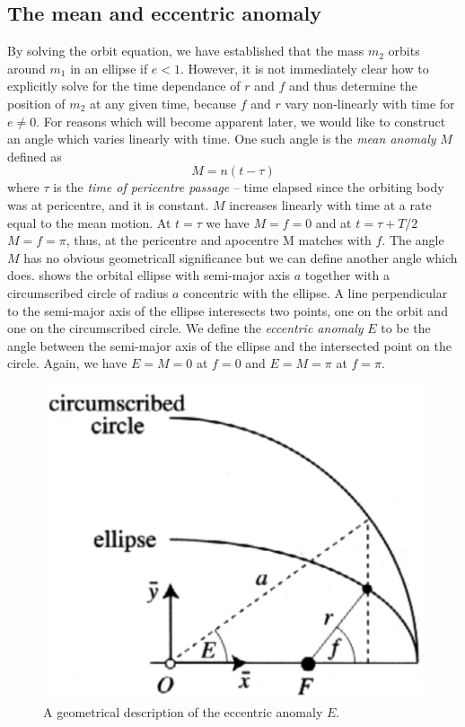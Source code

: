 \documentclass[ twoside,openright,titlepage,numbers=noenddot,headinclude,%
                footinclude=true,cleardoublepage=empty,abstractoff, %
                BCOR=5mm,paper=a4,fontsize=11pt,%
                american,%
                ]{scrreprt}
\begin{document}
\subsection{The mean and eccentric anomaly}
By solving the orbit equation, we have established that the mass $m_2$ orbits 
around $m_1$ in an ellipse if $e<1$. However, it is not immediately clear how
to explicitly solve for the time dependance of $r$ and $f$ and thus determine 
the position of $m_2$ at any given time, because $f$ and $r$ vary
non-linearly with time for $e\neq 0$. For reasons which will become apparent 
later, we would like to construct an angle which varies linearly with time.
One such angle is the \emph{mean anomaly} $M$ defined as
\begin{equation}
    M=n(t-\tau)
\label{eq:mean_anomaly}
\end{equation}
where $\tau$ is the \emph{time of pericentre passage} -- time elapsed
since the orbiting body was at pericentre, and it is constant. $M$
increases linearly with time at a rate equal to the mean motion. At $t=\tau$ 
we have $M=f=0$
and at $t=\tau + T/2$ $M=f=\pi$, thus, at the pericentre and apocentre 
M matches with $f$. The angle $M$ has no obvious geometricall significance
but we can define another angle which does.  
shows the orbital ellipse with semi-major axis $a$ together with a 
circumscribed circle of radius $a$ concentric with the ellipse. A line 
perpendicular to the semi-major axis of the ellipse interesects two points,
one on the orbit and one on the circumscribed circle. We define the 
\emph{eccentric anomaly} $E$ to be the angle between the semi-major axis
of the ellipse and the intersected point on the circle. Again, we have
$E=M=0$ at $f=0$ and $E=M=\pi$ at $f=\pi$. 
\begin{figure}[htb]
\centering
\includegraphics[width=0.5\linewidth]{gfx/eccentric_anomaly.png}
\caption{A geometrical description of the eccentric anomaly $E$.}
\label{fig:eccentric_anomaly}
\end{figure}
\end{document}
